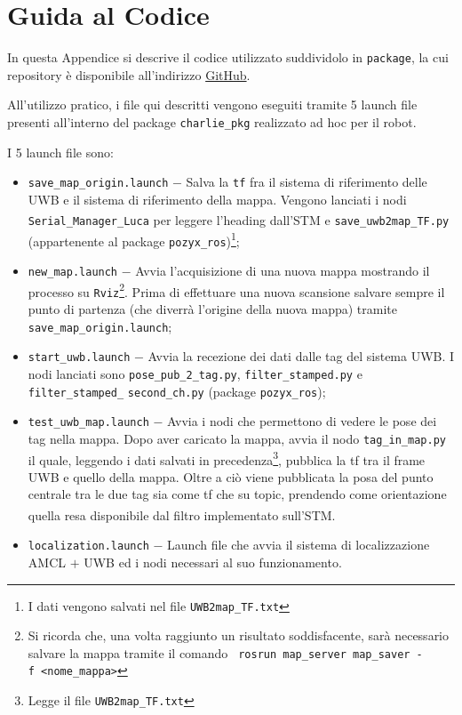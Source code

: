 
\chapter{Guida al Codice}
\label{appendice2}

In questa Appendice si descrive il codice utilizzato suddividolo in \verb!package!, la cui repository è disponibile all'indirizzo \href{https://github.com/ProgettoSGN/charlie}{GitHub}.

All'utilizzo pratico, i file qui descritti vengono eseguiti tramite 5 launch file presenti all'interno del package \verb!charlie_pkg! realizzato ad hoc per il robot.

\bigskip

I 5 launch file sono:
\begin{itemize}
    \item \verb!save_map_origin.launch! $-$ Salva la \verb!tf! fra il sistema di riferimento delle UWB e il sistema di riferimento della mappa. Vengono lanciati i nodi \verb!Serial_Manager_Luca! per leggere l'heading dall'STM\textsuperscript\textregistered\hspace{1mm} e \verb!save_uwb2map_TF.py! (appartenente al package \verb!pozyx_ros!)\footnote{I dati vengono salvati nel file \texttt{UWB2map\_TF.txt}};
    \item \verb!new_map.launch! $-$ Avvia l'acquisizione di una nuova mappa mostrando il processo su \texttt{Rviz}\footnote{Si ricorda che, una volta raggiunto un risultato soddisfacente, sarà necessario salvare la mappa tramite il comando \texttt{ rosrun\ map\_server\ map\_saver\ -f\ <nome\_mappa>}}. Prima di effettuare una nuova scansione salvare sempre il punto di partenza (che diverrà l'origine della nuova mappa) tramite \verb!save_map_origin.launch!;
    \item \verb!start_uwb.launch! $-$ Avvia la recezione dei dati dalle tag del sistema UWB. I nodi lanciati sono \verb!pose_pub_2_tag.py!, \verb!filter_stamped.py! e \verb!filter_stamped_! \newline \verb!second_ch.py! (package \verb!pozyx_ros!);
    \item \verb!test_uwb_map.launch! $-$ Avvia i nodi che permettono di vedere le pose dei tag nella mappa. Dopo aver caricato la mappa, avvia il nodo \verb!tag_in_map.py! il quale, leggendo i dati salvati in precedenza\footnote{Legge il file \texttt{UWB2map\_TF.txt}}, pubblica la tf tra il frame UWB e quello della mappa. Oltre a ciò viene pubblicata la posa del punto centrale tra le due tag sia come tf che su topic, prendendo come orientazione quella resa disponibile dal filtro implementato sull'STM\textsuperscript\textregistered.
    \item \verb!localization.launch! $-$ Launch file che avvia il sistema di localizzazione AMCL $+$ UWB ed i nodi necessari al suo funzionamento.
\end{itemize}

